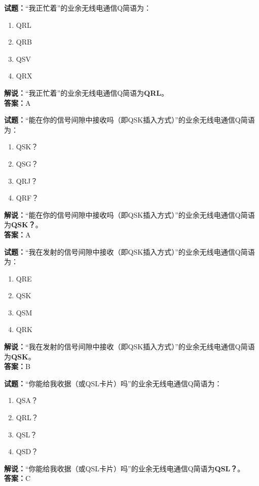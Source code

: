 \documentclass{ctexbook}
\begin{document}
\bigskip


\noindent\textbf{试题：}“我正忙着”的业余无线电通信Q简语为：
\begin{enumerate}[leftmargin=3em]
\item QRL
\item QRB
\item QSV
\item QRX
\end{enumerate}
\noindent\textbf{解说：}“我正忙着”的业余无线电通信Q简语为\textbf{QRL}。\\\noindent\textbf{答案：}A



\bigskip


\noindent\textbf{试题：}“能在你的信号间隙中接收吗（即QSK插入方式）”的业余无线电通信Q简语为：
\begin{enumerate}[leftmargin=3em]
\item QSK？
\item QSG？
\item QRJ？
\item QRF？
\end{enumerate}
\noindent\textbf{解说：}“能在你的信号间隙中接收吗（即QSK插入方式）”的业余无线电通信Q简语为\textbf{QSK？}。\\\noindent\textbf{答案：}A



\bigskip


\noindent\textbf{试题：}“我在发射的信号间隙中接收（即QSK插入方式）”的业余无线电通信Q简语为：
\begin{enumerate}[leftmargin=3em]
\item QRE
\item QSK
\item QSM
\item QRK
\end{enumerate}
\noindent\textbf{解说：}“我在发射的信号间隙中接收（即QSK插入方式）”的业余无线电通信Q简语为\textbf{QSK}。\\\noindent\textbf{答案：}B



\bigskip


\noindent\textbf{试题：}“你能给我收据（或QSL卡片）吗”的业余无线电通信Q简语为：
\begin{enumerate}[leftmargin=3em]
\item QSA？
\item QRL？
\item QSL？
\item QSD？
\end{enumerate}
\noindent\textbf{解说：}“你能给我收据（或QSL卡片）吗”的业余无线电通信Q简语为\textbf{QSL？}。\\\noindent\textbf{答案：}C
\end{document}

